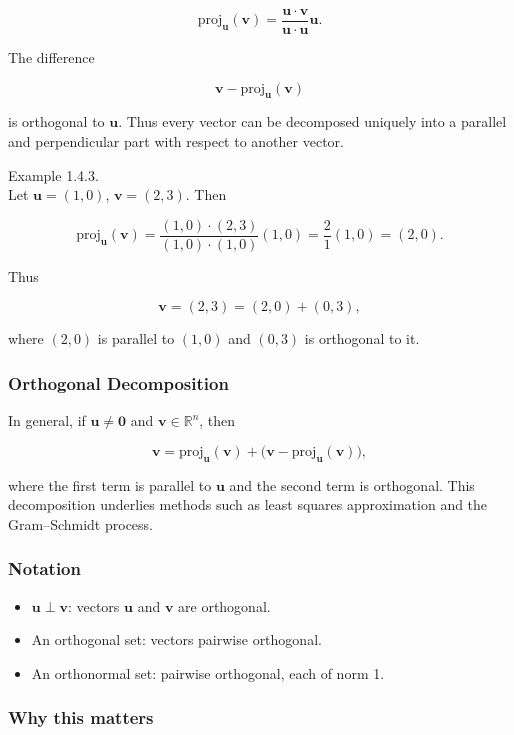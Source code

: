 \documentclass[
  12pt,
  a4paper,
]{article}
\begin{document}
\[\text{proj}_{\mathbf{u}}(\mathbf{v}) = \frac{\mathbf{u} \cdot \mathbf{v}}{\mathbf{u} \cdot \mathbf{u}} \mathbf{u}.\]

The difference

\[\mathbf{v} - \text{proj}_{\mathbf{u}}(\mathbf{v})\]

is orthogonal to \(\mathbf{u}\). Thus every vector can be decomposed
uniquely into a parallel and perpendicular part with respect to another
vector.

Example 1.4.3.\\
Let \(\mathbf{u} = (1,0)\), \(\mathbf{v} = (2,3)\). Then

\[\text{proj}_{\mathbf{u}}(\mathbf{v}) = \frac{(1,0)\cdot(2,3)}{(1,0)\cdot(1,0)} (1,0) 
= \frac{2}{1}(1,0) = (2,0).\]

Thus

\[\mathbf{v} = (2,3) = (2,0) + (0,3),\]

where \((2,0)\) is parallel to \((1,0)\) and \((0,3)\) is orthogonal to
it.

\subsubsection{Orthogonal Decomposition}\label{orthogonal-decomposition}

In general, if \(\mathbf{u} \neq \mathbf{0}\) and
\(\mathbf{v} \in \mathbb{R}^n\), then

\[\mathbf{v} = \text{proj}_{\mathbf{u}}(\mathbf{v}) + \big(\mathbf{v} - \text{proj}_{\mathbf{u}}(\mathbf{v})\big),\]

where the first term is parallel to \(\mathbf{u}\) and the second term
is orthogonal. This decomposition underlies methods such as least
squares approximation and the Gram--Schmidt process.

\subsubsection{Notation}\label{notation-4}

\begin{itemize}
\item
  \(\mathbf{u} \perp \mathbf{v}\): vectors \(\mathbf{u}\) and
  \(\mathbf{v}\) are orthogonal.
\item
  An orthogonal set: vectors pairwise orthogonal.
\item
  An orthonormal set: pairwise orthogonal, each of norm 1.
\end{itemize}

\subsubsection{Why this matters}\label{why-this-matters-3}
\end{document}
